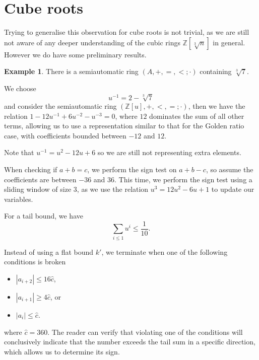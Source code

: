 \documentclass[british,a4paper,11pt,abstract=on]{scrreprt}
\theoremstyle{definition}
\newtheorem{example}[theorem]{Example}
\theoremstyle{remark}
\newcommand{\abs}[1]{\left\lvert #1 \right\rvert}
\newcommand{\Z}{\mathbb{Z}}
\newcommand{\cbrt}[1]{\sqrt[3]{#1}}
\begin{document}
\section{Cube roots}

Trying to generalise this observation for cube roots is not trivial,
as we are still not aware of any deeper understanding of the cubic rings \(\Z[\sqrt[3]{n}]\) in general.
However we do have some preliminary results.

\begin{example} \label{cube root 7}
    There is a semiautomatic ring \((A, +, =, <;\cdot)\) containing \(\cbrt{7}\).

    We choose \[ u^{-1} = 2 - \cbrt{7} \]
    and consider the semiautomatic ring \((\Z[u], +, <, =;\cdot)\),
    then we have the relation \(1 - 12u^{-1} + 6u^{-2} - u^{-3} = 0\), where \(12\) dominates the sum of all other terms,
    allowing us to use a representation similar to that for the Golden ratio case, with coefficients bounded between \(-12\) and \(12\).

    Note that \(u^{-1} = u^2 - 12u + 6\) so we are still not representing extra elements.

    When checking if \(a + b = c\), we perform the sign test on \(a + b - c\), so assume the coefficients are between \(-36\) and \(36\).
    This time, we perform the sign test using a sliding window of size \(3\), as we use the relation \(u^3 = 12u^2 - 6u + 1\) to update our variables.

    For a tail bound, we have \[\sum_{i\leq 1} u^i \leq \frac1{10}.\]

    Instead of using a flat bound \(k'\), we terminate when one of the following conditions is broken
    \begin{itemize}
        \item \(\abs{a_{i+2}} \leq 16\hat{c}\),
        \item \(\abs{a_{i+1}} \geq 4\hat{c}\), or
        \item \(\abs{a_{i}} \leq \hat{c}\).
    \end{itemize}
    where \(\hat{c} = 360\).
    The reader can verify that violating one of the conditions will conclusively indicate that the number exceeds the tail sum in a specific direction, which allows us to determine its sign.
\end{example}
\end{document}
